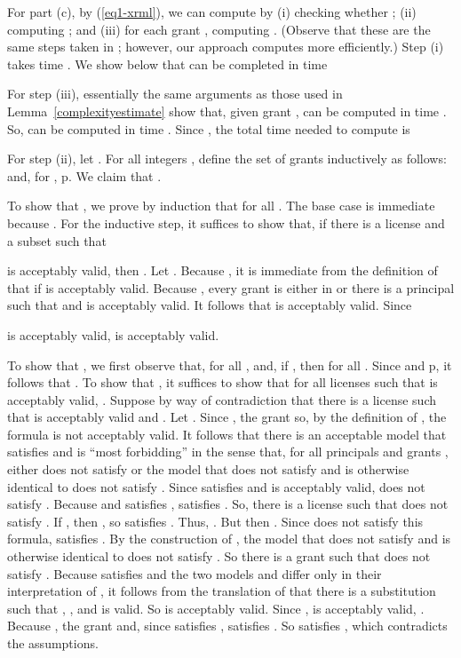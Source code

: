 \documentclass{acmtrans2m}
\newcommand{\<}{
}
\renewcommand{\>}{\rangle}
\begin{document}
\begin{sloppypar}
For part (c), by (\ref{eq1-xrml}), we can compute  by (i) checking whether ;
(ii) computing ; and (iii) for each grant
, computing
.  (Observe that these are the same steps taken in ; however, our
approach computes  more efficiently.)  Step (i) takes time .  We show below
that  can be completed in time

For step (iii), essentially the same arguments as those used in Lemma~\ref{complexityestimate}
show that, given grant ,  can be computed in time
.  So,  can be computed in time
.  Since , the total time needed to
compute  is


For step (ii), let .  For all integers , define the set 
of grants inductively as follows:  and, for ,
p.  We claim that .

To show that , we prove by induction that  for all .
The base case is immediate because .  For the inductive step, it suffices to show that, if
there is a license  and a subset  such that

is acceptably valid, then .  Let
.
Because , it is immediate from the definition of  that  if
 is acceptably valid.  Because , every grant
 is either in  or there is a principal  such that  and
 is acceptably valid.  It follows that
 is acceptably valid.
Since

is acceptably valid,  is acceptably valid.

To show that , we first observe that, for all , 
and, if , then  for all .  Since  and
p, it follows that
.  To show that , it suffices to show that
for all licenses  such that  is acceptably valid,
.  Suppose by way of contradiction that there is a license  such that
 is acceptably valid and .  Let
.  Since
, the grant  so, by the definition of
, the formula  is not acceptably valid.  It
follows that there is an acceptable model  that satisfies 
and is ``most forbidding'' in the sense that, for all principals  and grants , either  does
not satisfy  or the model  that does not satisfy
 and is otherwise identical to  does not satisfy .  Since  satisfies  and  is acceptably valid,
 does not satisfy .  Because  and  satisfies , 
satisfies .  So, there is a
license  such that  does not satisfy
.  If
, then
,
so  satisfies .  Thus,
.  But then
.
Since  does not satisfy this formula,  satisfies .  By the
construction of , the model  that does not satisfy  and is
otherwise identical to  does not satisfy .  So there is a grant
 such that 
does not satisfy .  Because  satisfies
 and the two models  and  differ
only in their interpretation of , it follows from the translation
of  that there is a substitution  such that
, , and
 is valid.  So
 is
acceptably valid. Since ,  is
acceptably valid, .  Because , the grant
 and, since  satisfies ,  satisfies
.  So  satisfies
, which contradicts the assumptions.


\end{sloppypar}
\end{document}
